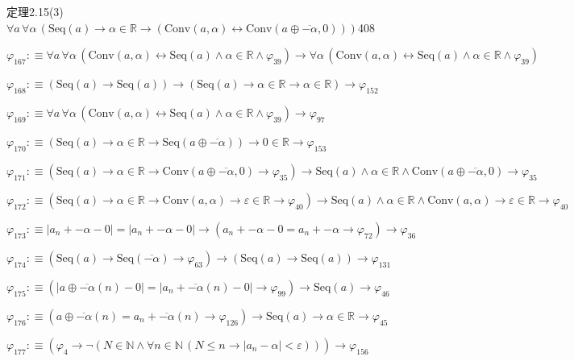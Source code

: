 \begin{fullproof}{定理2.15(3)}{$\forall a\,\forall \alpha\,(\mathrm{Seq}(a) \to \alpha \in \mathbb{R} \to (\mathrm{Conv}(a,\alpha) \leftrightarrow \mathrm{Conv}(a \oplus \overline{-\alpha},0)))$}{408}
\begin{abbrevlist}
\item $\varphi_{167} :\equiv \forall a\,\forall \alpha\,(\mathrm{Conv}(a,\alpha) \leftrightarrow \mathrm{Seq}(a) \land \alpha \in \mathbb{R} \land \varphi_{39}) \to \forall \alpha\,(\mathrm{Conv}(a,\alpha) \leftrightarrow \mathrm{Seq}(a) \land \alpha \in \mathbb{R} \land \varphi_{39})$
\item $\varphi_{168} :\equiv (\mathrm{Seq}(a) \to \mathrm{Seq}(a)) \to (\mathrm{Seq}(a) \to \alpha \in \mathbb{R} \to \alpha \in \mathbb{R}) \to \varphi_{152}$
\item $\varphi_{169} :\equiv \forall a\,\forall \alpha\,(\mathrm{Conv}(a,\alpha) \leftrightarrow \mathrm{Seq}(a) \land \alpha \in \mathbb{R} \land \varphi_{39}) \to \varphi_{97}$
\item $\varphi_{170} :\equiv (\mathrm{Seq}(a) \to \alpha \in \mathbb{R} \to \mathrm{Seq}(a \oplus \overline{-\alpha})) \to 0 \in \mathbb{R} \to \varphi_{153}$
\item $\varphi_{171} :\equiv (\mathrm{Seq}(a) \to \alpha \in \mathbb{R} \to \mathrm{Conv}(a \oplus \overline{-\alpha},0) \to \varphi_{35}) \to \mathrm{Seq}(a) \land \alpha \in \mathbb{R} \land \mathrm{Conv}(a \oplus \overline{-\alpha},0) \to \varphi_{35}$
\item $\varphi_{172} :\equiv (\mathrm{Seq}(a) \to \alpha \in \mathbb{R} \to \mathrm{Conv}(a,\alpha) \to \varepsilon \in \mathbb{R} \to \varphi_{40}) \to \mathrm{Seq}(a) \land \alpha \in \mathbb{R} \land \mathrm{Conv}(a,\alpha) \to \varepsilon \in \mathbb{R} \to \varphi_{40}$
\item $\varphi_{173} :\equiv \lvert a_{n} + -\alpha - 0 \rvert = \lvert a_{n} + -\alpha - 0 \rvert \to (a_{n} + -\alpha - 0 = a_{n} + -\alpha \to \varphi_{72}) \to \varphi_{36}$
\item $\varphi_{174} :\equiv (\mathrm{Seq}(a) \to \mathrm{Seq}(\overline{-\alpha}) \to \varphi_{63}) \to (\mathrm{Seq}(a) \to \mathrm{Seq}(a)) \to \varphi_{131}$
\item $\varphi_{175} :\equiv (\lvert a \oplus \overline{-\alpha}(n) - 0 \rvert = \lvert a_{n} + \overline{-\alpha}(n) - 0 \rvert \to \varphi_{99}) \to \mathrm{Seq}(a) \to \varphi_{46}$
\item $\varphi_{176} :\equiv (a \oplus \overline{-\alpha}(n) = a_{n} + \overline{-\alpha}(n) \to \varphi_{126}) \to \mathrm{Seq}(a) \to \alpha \in \mathbb{R} \to \varphi_{45}$
\item $\varphi_{177} :\equiv (\varphi_{4} \to \neg (N \in \mathbb{N} \land \forall n \in \mathbb{N}\,(N \leq n \to \lvert a_{n} - \alpha \rvert < \varepsilon))) \to \varphi_{156}$

\end{abbrevlist}
\end{fullproof}
